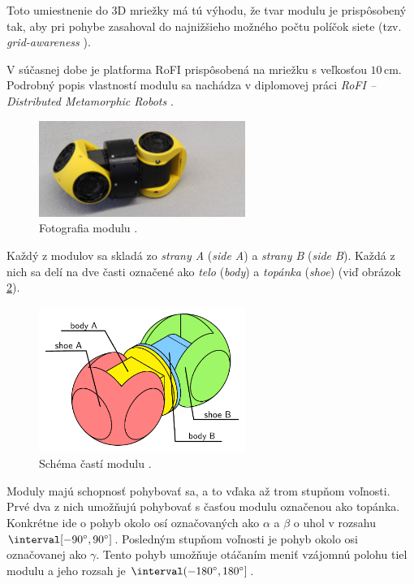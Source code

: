 \documentclass[
  printed, %
  oneside, %
  notable,   %
  nolof,     %
  nolot,     %
]{fithesis3}
\begin{document}
Toto umiestnenie do 3D mriežky má tú výhodu, že tvar modulu je prispôsobený tak, aby pri pohybe zasahoval do najnižšieho možného počtu políčok siete (tzv. \textit{grid-awareness} \cite{mrazekMasterThesis}). 

V súčasnej dobe je platforma RoFI prispôsobená na mriežku s veľkosťou $10$\,cm. Podrobný popis vlastností modulu sa nachádza v diplomovej práci \textit{RoFI – Distributed Metamorphic Robots} \cite{mrazekMasterThesis}. 

\begin{figure}[hbt!]
    \centering
    \includegraphics[width=0.6\textwidth]{pictures/module.jpg}
    \caption[Fotografia modulu]{Fotografia modulu \cite{rofiWeb}.}
    \label{fig:module}
\end{figure}

Každý z modulov sa skladá zo \textit{strany A} (\textit{side A}) a \textit{strany B} (\textit{side B}). Každá z nich sa delí na dve časti označené ako \textit{telo} (\textit{body}) a \textit{topánka} (\textit{shoe}) (viď obrázok \ref{fig:module_parts}). 

\begin{figure}[hbt!]
    \centering
    \includegraphics[width=0.6\textwidth]{pictures/module_parts.pdf}
    \caption[Časti modulu]{Schéma častí modulu \cite{mrazekMasterThesis}.}
    \label{fig:module_parts}
\end{figure}

Moduly majú schopnosť pohybovať sa, a to vďaka až trom stupňom voľnosti. Prvé dva z nich umožňujú pohybovať s časťou modulu označenou ako topánka. Konkrétne ide o pohyb okolo osí označovaných ako $\alpha$ a $\beta$ o uhol v rozsahu $\interval[{-90\degree, 90\degree}]$. Posledným stupňom voľnosti je pohyb okolo osi označovanej ako $\gamma$. Tento pohyb umožňuje otáčaním meniť vzájomnú polohu tiel modulu a jeho rozsah je $\interval({-180\degree, 180\degree}]$. 
\end{document}
